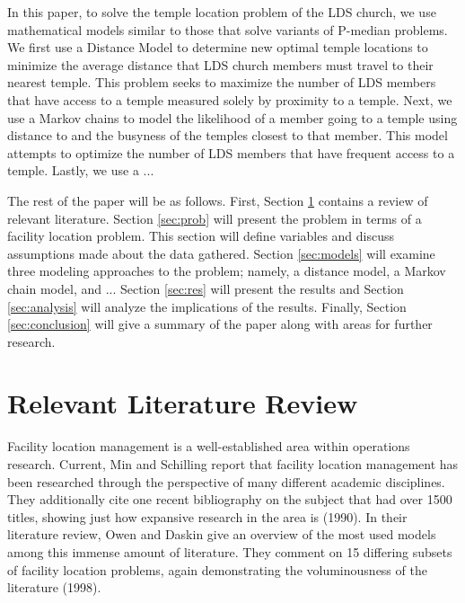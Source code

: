 \documentclass[twoside,twocolumn]{article}
\begin{document}
In this paper, to solve the temple location problem of the LDS church, we use mathematical models similar to those that solve variants of P-median problems.
We first use a Distance Model to determine new optimal temple locations to minimize the average distance that LDS church members must travel to their nearest temple. %
This problem seeks to maximize the number of LDS members that have access to a temple measured solely by proximity to a temple.
Next, we use a Markov chains to model the likelihood of a member going to a temple using distance to and the busyness of the temples closest to that member.
This model attempts to optimize the number of LDS members that have frequent access to a temple.
Lastly, we use a ... %

The rest of the paper will be as follows.
First, Section \ref{sec:litrev} contains a review of relevant literature.
Section \ref{sec:prob} will present the problem in terms of a facility location problem.
This section will define variables and discuss assumptions made about the data gathered.
Section \ref{sec:models} will examine three modeling approaches to the problem; namely, a distance model, a Markov chain model, and ... %
Section \ref{sec:res} will present the results and Section \ref{sec:analysis} will analyze the implications of the results.
Finally, Section \ref{sec:conclusion} will give a summary of the paper along with areas for further research.

\section{Relevant Literature Review}
\label{sec:litrev}
Facility location management is a well-established area within operations research.
Current, Min and Schilling report that facility location management has been researched through the perspective of many different academic disciplines.
They additionally cite one recent bibliography on the subject that had over 1500 titles, showing just how expansive research in the area is (1990).
In their literature review, Owen and Daskin give an overview of the most used models among this immense amount of literature. 
They comment on 15 differing subsets of facility location problems, again demonstrating the voluminousness of the literature (1998).
\end{document}
